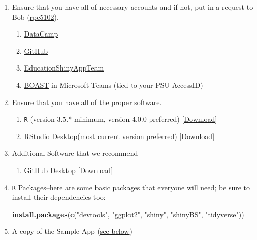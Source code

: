 \documentclass[
]{book}
\newenvironment{Shaded}{\begin{snugshade}}{\end{snugshade}}
\newcommand{\KeywordTok}[1]{\textcolor[rgb]{0.13,0.29,0.53}{\textbf{#1}}}
\newcommand{\NormalTok}[1]{#1}
\newcommand{\StringTok}[1]{\textcolor[rgb]{0.31,0.60,0.02}{#1}}
\providecommand{\tightlist}{%
  \setlength{\itemsep}{0pt}\setlength{\parskip}{0pt}}
\begin{document}
\begin{enumerate}
\def\labelenumi{\arabic{enumi}.}
\item
  Ensure that you have all of necessary accounts and if not, put in a request to Bob (\href{mailto:rpc5102@psu.edu}{rpc5102}).

  \begin{enumerate}
  \def\labelenumii{\alph{enumii}.}
  \tightlist
  \item
    \href{https://www.datacamp.com/}{DataCamp}\\
  \item
    \href{https://github.com/}{GitHub}\\
  \item
    \href{https://github.com/EducationShinyAppTeam}{EducationShinyAppTeam}
  \item
    \href{https://teams.microsoft.com/l/team/19\%3a8423bc25992a4451952d8312b497324d\%40thread.skype/conversations?groupId=a83c9d1b-6bcc-46f4-aa25-82b2fad862ec\&tenantId=7cf48d45-3ddb-4389-a9c1-c115526eb52e}{BOAST} in Microsoft Teams (tied to your PSU AccessID)
  \end{enumerate}
\item
  Ensure that you have all of the proper software.

  \begin{enumerate}
  \def\labelenumii{\alph{enumii}.}
  \tightlist
  \item
    \texttt{R} (version 3.5.* minimum, version 4.0.0 preferred) {[}\href{https://cloud.r-project.org/}{Download}{]}
  \item
    RStudio Desktop(most current version preferred) {[}\href{https://rstudio.com/products/rstudio/download/\#download}{Download}{]}
  \end{enumerate}
\item
  Additional Software that we recommend

  \begin{enumerate}
  \def\labelenumii{\alph{enumii}.}
  \tightlist
  \item
    GitHub Desktop {[}\href{https://desktop.github.com/}{Download}{]}
  \end{enumerate}
\item
  \texttt{R} Packages--here are some basic packages that everyone will need; be sure to install their dependencies too:

\begin{Shaded}
\begin{Highlighting}[]
\KeywordTok{install.packages}\NormalTok{(}\KeywordTok{c}\NormalTok{(}\StringTok{"devtools"}\NormalTok{, }\StringTok{"ggplot2"}\NormalTok{, }\StringTok{"shiny"}\NormalTok{, }\StringTok{"shinyBS"}\NormalTok{, }\StringTok{"tidyverse"}\NormalTok{))}
\end{Highlighting}
\end{Shaded}
\item
  A copy of the Sample App (\protect\hyperlink{sample-app}{see below})
\end{enumerate}
\end{document}
